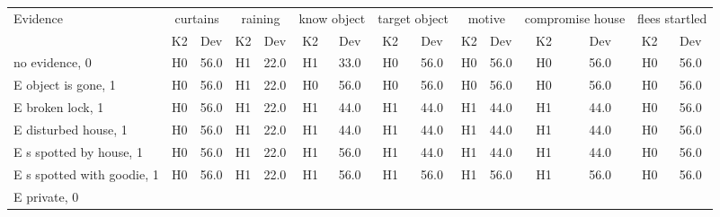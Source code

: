 \begin{table}\begin{tabular}{l|cc|cc|cc|cc|cc|cc|cc}\toprule\multirow{2}{*}{Evidence} & \multicolumn{2}{c}{curtains}& \multicolumn{2}{c}{raining}& \multicolumn{2}{c}{know object}& \multicolumn{2}{c}{target object}& \multicolumn{2}{c}{motive}& \multicolumn{2}{c}{compromise house}& \multicolumn{2}{c}{flees startled}\\& {K2} & {Dev}& {K2} & {Dev}& {K2} & {Dev}& {K2} & {Dev}& {K2} & {Dev}& {K2} & {Dev}& {K2} & {Dev}\\\midrule
no evidence, 0 & \cellcolor{Bittersweet}H0&\cellcolor{Bittersweet}56.0&\cellcolor{Bittersweet}H1&\cellcolor{Bittersweet}22.0&\cellcolor{Bittersweet}H1&\cellcolor{Bittersweet}33.0&\cellcolor{Bittersweet}H0&\cellcolor{Bittersweet}56.0&\cellcolor{Bittersweet}H0&\cellcolor{Bittersweet}56.0&\cellcolor{Bittersweet}H0&\cellcolor{Bittersweet}56.0&\cellcolor{Bittersweet}H0&\cellcolor{Bittersweet}56.0\\E object is gone, 1 & \cellcolor{Bittersweet}H0&\cellcolor{Bittersweet}56.0&\cellcolor{Bittersweet}H1&\cellcolor{Bittersweet}22.0&\cellcolor{Bittersweet}H0&\cellcolor{Bittersweet}56.0&\cellcolor{Bittersweet}H0&\cellcolor{Bittersweet}56.0&\cellcolor{Bittersweet}H0&\cellcolor{Bittersweet}56.0&\cellcolor{Bittersweet}H0&\cellcolor{Bittersweet}56.0&\cellcolor{Bittersweet}H0&\cellcolor{Bittersweet}56.0\\E broken lock, 1 & \cellcolor{Bittersweet}H0&\cellcolor{Bittersweet}56.0&\cellcolor{Bittersweet}H1&\cellcolor{Bittersweet}22.0&\cellcolor{Bittersweet}H1&\cellcolor{Bittersweet}44.0&\cellcolor{Bittersweet}H1&\cellcolor{Bittersweet}44.0&\cellcolor{Bittersweet}H1&\cellcolor{Bittersweet}44.0&\cellcolor{Bittersweet}H1&\cellcolor{Bittersweet}44.0&\cellcolor{Bittersweet}H0&\cellcolor{Bittersweet}56.0\\E disturbed house, 1 & \cellcolor{Bittersweet}H0&\cellcolor{Bittersweet}56.0&\cellcolor{Bittersweet}H1&\cellcolor{Bittersweet}22.0&\cellcolor{Bittersweet}H1&\cellcolor{Bittersweet}44.0&\cellcolor{Bittersweet}H1&\cellcolor{Bittersweet}44.0&\cellcolor{Bittersweet}H1&\cellcolor{Bittersweet}44.0&\cellcolor{Bittersweet}H1&\cellcolor{Bittersweet}44.0&\cellcolor{Bittersweet}H0&\cellcolor{Bittersweet}56.0\\E s spotted by house, 1 & \cellcolor{Bittersweet}H0&\cellcolor{Bittersweet}56.0&\cellcolor{Bittersweet}H1&\cellcolor{Bittersweet}22.0&\cellcolor{Bittersweet}H1&\cellcolor{Bittersweet}56.0&\cellcolor{Bittersweet}H1&\cellcolor{Bittersweet}44.0&\cellcolor{Bittersweet}H1&\cellcolor{Bittersweet}44.0&\cellcolor{Bittersweet}H1&\cellcolor{Bittersweet}44.0&\cellcolor{Bittersweet}H0&\cellcolor{Bittersweet}56.0\\E s spotted with goodie, 1 & \cellcolor{Bittersweet}H0&\cellcolor{Bittersweet}56.0&\cellcolor{Bittersweet}H1&\cellcolor{Bittersweet}22.0&\cellcolor{Bittersweet}H1&\cellcolor{Bittersweet}56.0&\cellcolor{Bittersweet}H1&\cellcolor{Bittersweet}56.0&\cellcolor{Bittersweet}H1&\cellcolor{Bittersweet}56.0&\cellcolor{Bittersweet}H1&\cellcolor{Bittersweet}56.0&\cellcolor{Bittersweet}H0&\cellcolor{Bittersweet}56.0\\E private, 0 & 
\end{tabular}
\end{table}
